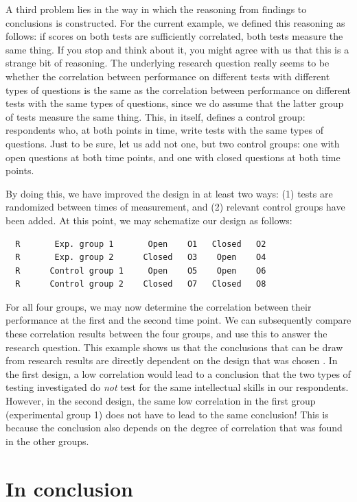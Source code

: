 \documentclass[
]{book}
\begin{document}
A third problem lies in the way in which the reasoning from findings to conclusions is constructed. For the current example, we defined this reasoning as follows: if scores on both tests are sufficiently correlated, both tests measure the same thing. If you stop and think about it, you might agree with us that this is a strange bit of reasoning. The underlying research question really seems to be whether the correlation between performance on different tests with different types of questions is the same as the correlation between performance on different tests with the same types of questions, since we do assume that the latter group of tests measure the same thing. This, in itself, defines a control group: respondents who, at both points in time, write tests with the same types of questions. Just to be sure, let us add not one, but two control groups: one with open questions at both time points, and one with closed questions at both time points.

By doing this, we have improved the design in at least two ways: (1) tests are randomized between times of measurement, and (2) relevant control groups have been added. At this point, we may schematize our design as follows:

\begin{verbatim}
  R       Exp. group 1       Open    O1   Closed   O2
  R       Exp. group 2      Closed   O3    Open    O4
  R      Control group 1     Open    O5    Open    O6
  R      Control group 2    Closed   O7   Closed   O8
\end{verbatim}

For all four groups, we may now determine the correlation between their performance at the first and the second time point. We can subsequently compare these correlation results between the four groups, and use this to answer the research question. This example shows us that the conclusions that can be draw from research results are directly dependent on the design that was chosen \citep{Levin99}. In the first design, a low correlation would lead to a conclusion that the two types of testing investigated do \emph{not} test for the same intellectual skills in our respondents. However, in the second design, the same low correlation in the first group (experimental group 1) does not have to lead to the same conclusion! This is because the conclusion also depends on the degree of correlation that was found in the other groups.

\hypertarget{in-conclusion}{%
\section{In conclusion}\label{in-conclusion}}
\end{document}

